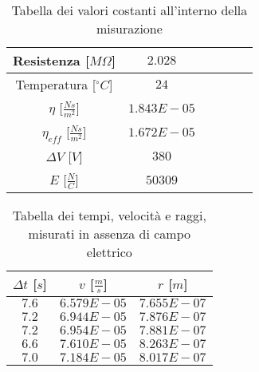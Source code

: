 \documentclass{article}
\begin{document}
\begin{multicols}{2}

\begin{table}[H]
	\centering
	\begin{tabular}{| c | c | c | c | c | c |}
		\hline
		Resistenza [$M\Omega$] & $2.028$\\
		\hline
		Temperatura [$^\circ C$]& $24$\\
		\hline
		$\eta$ [$\frac{Ns}{m^2}$] & $1.843E-05$\\
		\hline
		$\eta_{eff}$ [$\frac{Ns}{m^2}$] & $1.672E-05$\\
		\hline
		$\Delta V$ [$V$] & $380$\\
		\hline
		$E$ [$\frac N C$] & $50309$\\
		\hline
	\end{tabular}
	\caption{Tabella dei valori costanti all'interno della misurazione}
	\label{}
\end{table}

\columnbreak

\begin{table}[H]
	\centering
	\begin{tabular}{| c | c | c |}
		\hline
		$\Delta t$ [$s$] & $v$ [$\frac ms$] & $r$ [$m$] \\
		\hline
		$7.6$ & $6.579E-05$ & $7.655E-07$ \\
		$7.2$ & $6.944E-05$ & $7.876E-07$ \\
		$7.2$ & $6.954E-05$ & $7.881E-07$ \\
		$6.6$ & $7.610E-05$ & $8.263E-07$ \\
		$7.0$ & $7.184E-05$ & $8.017E-07$ \\
		\hline
	\end{tabular}
	\caption{Tabella dei tempi, velocità e raggi, misurati in assenza di campo elettrico}
	\label{}
\end{table}
	
\end{multicols}
\end{document}
